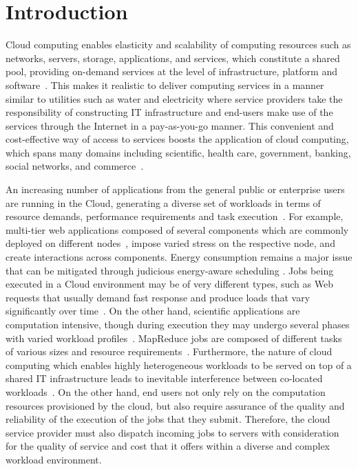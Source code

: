 \documentclass[journal]{IEEEtran}
\begin{document}
\section{Introduction}
Cloud computing enables elasticity and scalability of computing resources such as networks, servers, storage, applications, and services, which constitute a shared pool, providing on-demand services at the level of infrastructure, platform and software~\cite{mell2009}. This makes it realistic to deliver computing services in a manner similar to utilities such as water and electricity where service providers take the responsibility of constructing IT infrastructure and end-users make use of the services through the Internet in a pay-as-you-go manner. This convenient and cost-effective way of access to services boosts the application of cloud computing, which spans many domains including scientific, health care, government, banking, social networks, and commerce~\cite{buyya2013}. 

An increasing number of applications from the general public or enterprise users are running in the Cloud, generating a diverse set of workloads in terms of resource demands, performance requirements and task execution~\cite{Delimitrou2013}. For example, multi-tier web applications composed of several components which are commonly deployed on different nodes~\cite{Padala2007}, impose varied stress on the respective node, and create interactions across components. Energy consumption remains a major issue \cite{berl2010energy} that can be mitigated through judicious energy-aware scheduling \cite{GelenbeL13,thai13}. 
Jobs being executed in a Cloud environment may be of very different types, such as Web requests that usually demand fast response and produce loads that vary significantly over time~\cite{Jianfeng2013}. 
On the other hand, scientific applications are computation intensive, 
though during execution  they may undergo several phases with varied workload profiles~\cite{Delimitrou2013,Iosup2011}. MapReduce jobs are composed of different tasks of various sizes and resource requirements~\cite{Jianfeng2013}. Furthermore, the nature of cloud computing which enables highly heterogeneous workloads to be served on top of a shared IT infrastructure leads to inevitable interference between co-located workloads~\cite{Zhuravlev}. On the other hand, end users not only rely on the computation resources provisioned by the cloud, but also require assurance of the quality and reliability of the execution of the jobs that they submit. Therefore, the cloud service provider must also dispatch incoming jobs to servers with consideration for the quality of service and cost that it offers within a diverse and complex workload environment.
\end{document}
